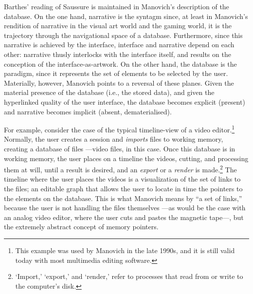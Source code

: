 Barthes' reading of Saussure is maintained in Manovich's description of the database. On the one hand, narrative is the syntagm since, at least in Manovich's rendition of narrative in the visual art world and the gaming world, it is the trajectory through the navigational space of a database. Furthermore, since this narrative is achieved by the interface, interface and narrative depend on each other: narrative thusly interlocks with the interface itself, and results on the conception of the interface-as-artwork. On the other hand, the database is the paradigm, since it represents the set of elements to be selected by the user. Materially, however, Manovich points to a reversal of these planes. Given the material presence of the database (i.e., the stored data), and given the hyperlinked quality of the user interface, the database becomes explicit (present) and narrative becomes implicit (absent, dematerialised).

For example, consider the case of the typical timeline-view of a video editor.\footnote{This example was used by Manovich in the late 1990s, and it is still valid today with most multimedia editing software.} Normally, the user creates a session and \textit{imports} files to working memory, creating a database of files ---video files, in this case. Once this database is in working memory, the user places on a timeline the videos, cutting, and processing them at will, until a result is desired, and an \textit{export} or a \textit{render} is made.\footnote{`Import,' `export,' and `render,' refer to processes that read from or write to the computer's disk.} The timeline where the user places the videos is a visualization of the set of links to the files; an editable graph that allows the user to locate in time the pointers to the elements on the database. This is what Manovich means by ``a set of links,'' because the user is not handling the files themselves ---as would be the case with an analog video editor, where the user cuts and pastes the magnetic tape---, but the extremely abstract concept of memory pointers. 

